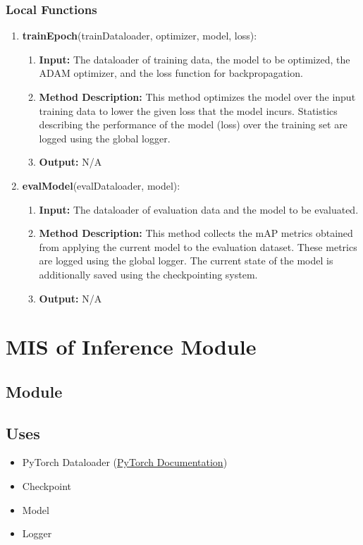 \documentclass[12pt, titlepage]{article}
\begin{document}
\subsubsection{Local Functions}

\begin{enumerate}
  \item \textbf{trainEpoch}(trainDataloader, optimizer, model, loss):
  \begin{enumerate}
    \item \textbf{Input:} The dataloader of training data, the model to be optimized, the ADAM optimizer, and the loss function for backpropagation.
    \item \textbf{Method Description:} This method optimizes the model over the input training data to lower the given loss that the model incurs. 
    Statistics describing the performance of the model (loss) over the training set are logged using the global logger.
    \item \textbf{Output:} N/A 
  \end{enumerate}
  \item \textbf{evalModel}(evalDataloader, model):
  \begin{enumerate}
    \item \textbf{Input:} The dataloader of evaluation data and the model to be evaluated.
    \item \textbf{Method Description:} This method collects the mAP metrics obtained from applying the current model to the evaluation dataset. These
    metrics are logged using the global logger. The current state of the model is additionally saved using the checkpointing system.
    \item \textbf{Output:} N/A
  \end{enumerate}
\end{enumerate}

\newpage

\section{MIS of Inference Module} \label{Module} 

\subsection{Module}



\subsection{Uses}
\begin{itemize}
  \item PyTorch Dataloader (\href{https://pytorch.org/tutorials/beginner/basics/data_tutorial.html}{PyTorch Documentation})
  \item Checkpoint
  \item Model
  \item Logger
\end{itemize}
\end{document}
